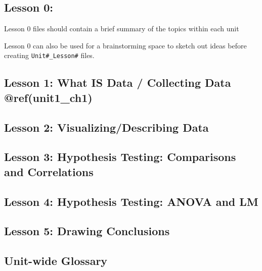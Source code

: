 \documentclass[
]{book}
\begin{document}
\hypertarget{lesson-0}{%
\subsection{Lesson 0:}\label{lesson-0}}

Lesson 0 files should contain a brief summary of the topics within each unit

Lesson 0 can also be used for a brainstorming space to sketch out ideas before creating \texttt{Unit\#\_Lesson\#} files.

\hypertarget{lesson-1-what-is-data-collecting-data-refunit1_ch1}{%
\subsection*{Lesson 1: What IS Data / Collecting Data @ref(unit1\_ch1)}\label{lesson-1-what-is-data-collecting-data-refunit1_ch1}}

\hypertarget{lesson-2-visualizingdescribing-data}{%
\subsection*{Lesson 2: Visualizing/Describing Data}\label{lesson-2-visualizingdescribing-data}}

\hypertarget{lesson-3-hypothesis-testing-comparisons-and-correlations}{%
\subsection*{Lesson 3: Hypothesis Testing: Comparisons and Correlations}\label{lesson-3-hypothesis-testing-comparisons-and-correlations}}

\hypertarget{lesson-4-hypothesis-testing-anova-and-lm}{%
\subsection*{Lesson 4: Hypothesis Testing: ANOVA and LM}\label{lesson-4-hypothesis-testing-anova-and-lm}}

\hypertarget{lesson-5-drawing-conclusions}{%
\subsection*{Lesson 5: Drawing Conclusions}\label{lesson-5-drawing-conclusions}}

\hypertarget{unit-wide-glossary}{%
\subsection*{Unit-wide Glossary}\label{unit-wide-glossary}}
\end{document}

